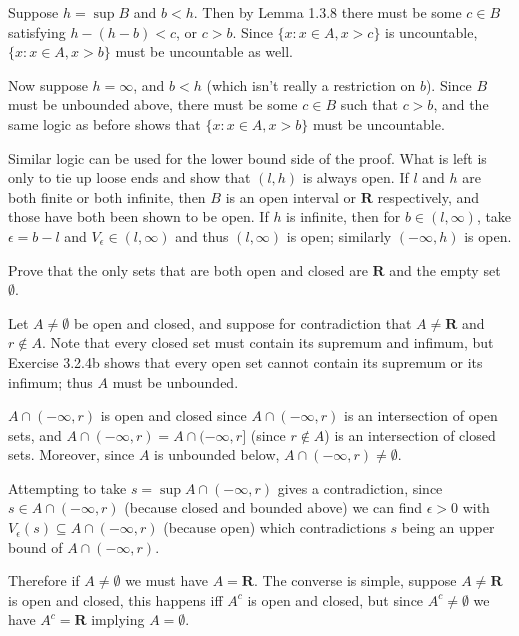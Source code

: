 \begin{solution}
    Suppose \(h = \sup B\) and \(b < h\). Then by Lemma 1.3.8 there must be some \(c \in B\) satisfying \(h - (h - b) < c\), or \(c > b\). Since \(\{x : x \in A, x > c\}\) is uncountable, \(\{x : x \in A, x > b\}\) must be uncountable as well.

    Now suppose \(h = \infty\), and \(b < h\) (which isn't really a restriction on \(b\)). Since \(B\) must be unbounded above, there must be some \(c \in B\) such that \(c > b\), and the same logic as before shows that \(\{x : x \in A, x > b\}\) must be uncountable.

    Similar logic can be used for the lower bound side of the proof. What is left is only to tie up loose ends and show that \((l, h)\) is always open. If \(l\) and \(h\) are both finite or both infinite, then \(B\) is an open interval or \(\mathbf{R}\) respectively, and those have both been shown to be open. If \(h\) is infinite, then for \(b \in (l, \infty)\), take \(\epsilon = b - l\) and \(V_\epsilon \in (l, \infty)\) and thus \((l, \infty)\) is open; similarly \((-\infty, h)\) is open.

\end{solution}

\begin{exercise}
  Prove that the only sets that are both open and closed are $\mathbf{R}$ and the empty set $\emptyset$.
\end{exercise}

\begin{solution}
  Let $A \ne \emptyset$ be open and closed, and suppose for contradiction that $A \ne \mathbf R$ and $r \notin A$. Note that every closed set must contain its supremum and infimum, but Exercise 3.2.4b shows that every open set cannot contain its supremum or its infimum; thus \(A\) must be unbounded.

  $A \cap (-\infty, r)$ is open and closed since $A \cap (-\infty, r)$ is an intersection of open sets, and $A \cap (-\infty, r) = A \cap (-\infty, r]$ (since $r \notin A$) is an intersection of closed sets. Moreover, since \(A\) is unbounded below, \(A \cap (-\infty, r) \ne \emptyset\).

  Attempting to take $s = \sup A \cap (-\infty, r)$ gives a contradiction, since $s \in A \cap (-\infty, r)$ (because closed and bounded above) we can find $\epsilon > 0$ with $V_\epsilon(s) \subseteq A \cap (-\infty, r)$ (because open) which contradictions $s$ being an upper bound of $A \cap (-\infty, r)$.

  Therefore if $A \ne \emptyset$ we must have $A = \mathbf{R}$. The converse is simple, suppose $A \ne \mathbf{R}$ is open and closed, this happens iff $A^c$ is open and closed, but since $A^c \ne \emptyset$ we have $A^c = \mathbf{R}$ implying $A = \emptyset$.
\end{solution}

